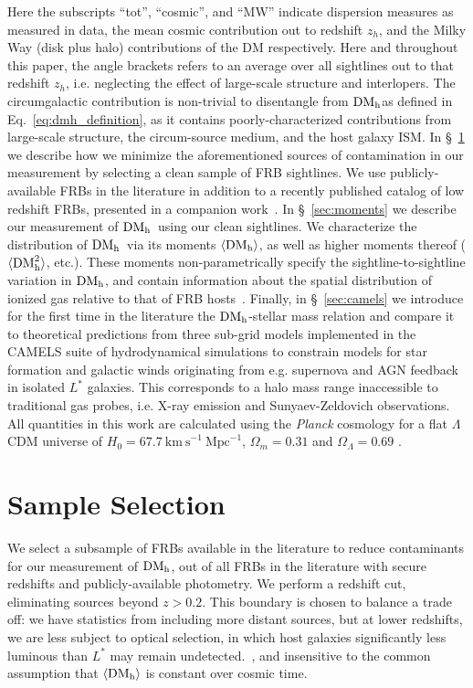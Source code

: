 \documentclass[twocolumn]{aastex631}
\newcommand{\dmh}{\ensuremath{{\rm DM}_\textrm{h}}}
\begin{document}
Here the subscripts ``tot'', ``cosmic'', and ``MW'' indicate dispersion measures as measured in data, the mean cosmic contribution out to redshift $z_h$, and the Milky Way (disk plus halo) contributions of the DM respectively. Here and throughout this paper, the angle brackets refers to an average over all sightlines out to that redshift $z_h$, i.e. neglecting the effect of large-scale structure and interlopers. The circumgalactic contribution is non-trivial to disentangle from \dmh as defined in Eq.~\ref{eq:dmh_definition}, as it contains poorly-characterized contributions from large-scale structure, the circum-source medium, and the host galaxy ISM. In  \S~\ref{sec:sample} we describe how we minimize the aforementioned sources of contamination in our measurement by selecting a clean sample of FRB sightlines. We use publicly-available FRBs in the literature in addition to a recently published catalog of low redshift FRBs, presented in a companion work~\citep{chime2024catalog}. 
In \S~\ref{sec:moments} we describe our measurement of \dmh\ using our clean sightlines. We characterize the distribution of \dmh\ via its moments $\langle \dmh \rangle$, as well as higher moments thereof ($\langle \dmh^2 \rangle$, etc.). These moments non-parametrically specify the sightline-to-sightline variation in $\dmh$, and contain information about the spatial distribution of ionized gas relative to that of FRB hosts~\citep{cordes2016radio, reischke2024analytical}. Finally, in \S~\ref{sec:camels} we introduce for the first time in the literature the \dmh-stellar mass relation and compare it to theoretical predictions from three sub-grid models implemented in the CAMELS suite of hydrodynamical simulations to constrain models for star formation and galactic winds originating from e.g. supernova and AGN feedback in isolated $L^*$ galaxies. This corresponds to a halo mass range inaccessible to traditional gas probes, i.e. X-ray emission and Sunyaev-Zeldovich observations. All quantities in this work are calculated using the \textit{Planck} cosmology for a flat $\Lambda$CDM universe of  $H_0 = 67.7~\mathrm{km~s}^{-1}~\mathrm{Mpc}^{-1}$, $\Omega_m=0.31$ and $\Omega_\Lambda = 0.69$ \citep{collaboration2020planck}. 

\section{Sample Selection}\label{sec:sample}
We select a subsample of FRBs available in the literature to reduce contaminants for our measurement of \dmh, out of all FRBs in the literature with secure redshifts and publicly-available photometry. We perform a redshift cut, eliminating sources beyond $z > 0.2$. This boundary is chosen to balance a trade off: we have statistics from including more distant sources, but at lower redshifts, we are less subject to optical selection, in which host galaxies significantly less luminous than $L^*$ may remain undetected.~\citep{seebeck2021effects,marnoch2023unseen,jahnsschindler2023how}, and insensitive to the common assumption that $\langle \dmh \rangle$ is constant over cosmic time.
\end{document}
